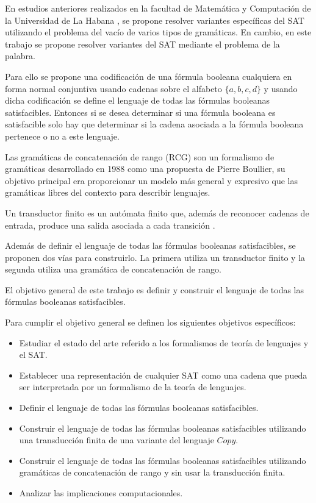 En estudios anteriores realizados en la facultad de Matemática y Computación de la Universidad de La Habana \cite{aCFSAT,aSRCSAT}, 
se propone resolver variantes específicas del SAT utilizando el problema del vacío de varios tipos de 
gramáticas. En cambio, en este trabajo se propone resolver variantes del SAT mediante el problema de la 
palabra. 

Para ello se propone una codificación de una fórmula booleana cualquiera en forma normal conjuntiva usando 
cadenas sobre el alfabeto $\{a,b,c,d\}$ y usando dicha codificación se define el lenguaje de todas las fórmulas 
booleanas satisfacibles. Entonces si se desea determinar si una fórmula booleana es satisfacible 
solo hay que determinar si la cadena asociada a la fórmula booleana pertenece o no a este lenguaje.

Las gramáticas de concatenación de rango (RCG) \cite{mainRCGBib} son un formalismo de
gramáticas desarrollado en 1988 como una propuesta de Pierre Boullier, su objetivo principal era
proporcionar un modelo más general y expresivo que las gramáticas libres del contexto para describir lenguajes.

Un transductor finito es un autómata finito que, además de reconocer cadenas de entrada, produce una salida asociada a cada transición \cite{finite_transducer}.

Además de definir el lenguaje de todas las fórmulas booleanas satisfacibles, se proponen dos vías para 
construirlo. La primera utiliza un transductor finito y la segunda utiliza una gramática de concatenación de rango.

El objetivo general de este trabajo es definir y construir el lenguaje de todas las fórmulas booleanas satisfacibles.

Para cumplir el objetivo general se definen los siguientes objetivos específicos:

\begin{itemize}
      \item Estudiar el estado del arte referido a los formalismos de teoría de lenguajes y el SAT.
      \item Establecer una representación de cualquier SAT como una cadena que pueda ser interpretada por un formalismo de la teoría de lenguajes.
      \item Definir el lenguaje de todas las fórmulas booleanas satisfacibles.
      \item Construir el lenguaje de todas las fórmulas booleanas satisfacibles utilizando una transducción finita de una variante del lenguaje $Copy$.
      \item Construir el lenguaje de todas las fórmulas booleanas satisfacibles  utilizando gramáticas de concatenación de rango y sin usar la transducción finita.
      \item Analizar las implicaciones computacionales.
\end{itemize}


